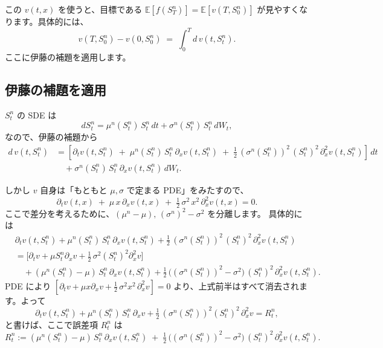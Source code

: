 \documentclass[a4paper]{jsarticle}
\begin{document}
この $v(t,x)$ を使うと、目標である $\mathbb{E}[f(S_T^n)] = \mathbb{E}[v(T, S_0^n)]$ が見やすくなります。具体的には、  
\[  
  v(T, S_0^n) - v(0,S_0^n)  
  \;=\;  
  \int_0^T d\,v(t, S_t^n).  
\]  
ここに伊藤の補題を適用します。  

\subsection{伊藤の補題を適用}  

$S_t^n$ の SDE は  
\[  
   dS_t^n  
   = \mu^n(S_t^n)\,S_t^n\,dt  
   + \sigma^n(S_t^n)\,S_t^n\,dW_t,  
\]  
なので、伊藤の補題から  
\begin{align*}  
  d\,v(t, S_t^n)  
  &=   
  \left[  
    \partial_t v(t,S_t^n)  
    \;+\;  
    \mu^n(S_t^n)\,S_t^n\,\partial_x v(t,S_t^n)  
    \;+\;  
    \frac12\,(\sigma^n(S_t^n))^2 \,(S_t^n)^2\,\partial_x^2 v(t,S_t^n)  
  \right]\,dt  
  \\
  &\quad {}  
  +   
  \sigma^n(S_t^n)\,S_t^n\,\partial_x v(t,S_t^n)\,dW_t.  
\end{align*}  

しかし $v$ 自身は「もともと $\mu,\sigma$ で定まる PDE」をみたすので、  
\[  
  \partial_t v(t,x)  
  \;+\;  
  \mu\, x\,\partial_x v(t,x)  
  \;+\;  
  \tfrac12\,\sigma^2\, x^2\,\partial_x^2 v(t,x)  
  =0.  
\]  
ここで差分を考えるために、$(\mu^n - \mu),\,(\sigma^n)^2 - \sigma^2$ を分離します。  
具体的には  
\begin{align*}  
  &  
  \partial_t v(t,S_t^n)  
  +  
  \mu^n(S_t^n)\,S_t^n\,\partial_x v(t,S_t^n)  
  +  
  \tfrac12\,(\sigma^n(S_t^n))^2\,(S_t^n)^2\,\partial_x^2 v(t,S_t^n)  
  \\[5pt]  
  &=   
  \bigl[\partial_t v + \mu S^n_t \partial_x v + \tfrac12\,\sigma^2 (S_t^n)^2 \partial_x^2 v \bigr]  
  \\
  &\quad {}  
  +   
  (\mu^n(S_t^n) - \mu)\,S_t^n \,\partial_x v(t,S_t^n)  
  +  
  \tfrac12\,\bigl((\sigma^n(S_t^n))^2 - \sigma^2\bigr)\,(S_t^n)^2\,\partial_x^2 v(t,S_t^n).  
\end{align*}  
PDE により $[\partial_t v + \mu x \partial_x v + \frac12\,\sigma^2 x^2\,\partial_x^2 v ]=0$ より、上式前半はすべて消去されます。よって  
\[  
  \partial_t v(t,S_t^n)  
  +  
  \mu^n(S_t^n)\,S_t^n\,\partial_x v  
  +  
  \tfrac12\,(\sigma^n(S_t^n))^2 (S_t^n)^2\,\partial_x^2 v  
  =  
  R_t^n,  
\]  
と書けば、ここで誤差項 $R_t^n$ は  
\[  
  R_t^n  
  :=  
  (\mu^n(S_t^n) - \mu)\,S_t^n\,\partial_x v(t,S_t^n)  
  \;+\;  
  \tfrac12\,  
  \bigl((\sigma^n(S_t^n))^2 - \sigma^2\bigr)\,(S_t^n)^2\,\partial_x^2 v(t,S_t^n).  
\]  
\end{document}
